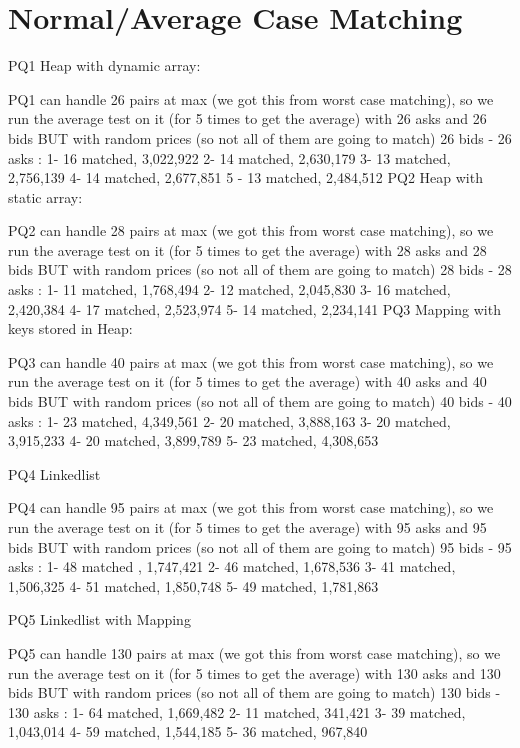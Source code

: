  \section{Normal/Average Case Matching}
 

 
PQ1 Heap with dynamic array:

 PQ1 can handle 26 pairs at max (we got this from worst case matching), so we run the average test on it (for 5 times to get the average) with 26 asks and 26 bids BUT with random prices (so not all of them are going to match)
26 bids - 26 asks : 
1- 16 matched, 3,022,922
2- 14 matched, 2,630,179
3- 13 matched, 2,756,139
4- 14 matched, 2,677,851
5 - 13 matched, 2,484,512
PQ2 Heap with static array:

 PQ2 can handle 28 pairs at max (we got this from worst case matching), so we run the average test on it (for 5 times to get the average) with 28 asks and 28 bids BUT with random prices (so not all of them are going to match)
28 bids - 28 asks : 
1- 11 matched, 1,768,494
2- 12 matched, 2,045,830
3- 16 matched, 2,420,384
4- 17 matched, 2,523,974
5- 14 matched, 2,234,141
PQ3 Mapping with keys stored in Heap:

 PQ3 can handle 40 pairs at max (we got this from worst case matching), so we run the average test on it (for 5 times to get the average) with 40 asks and 40 bids BUT with random prices (so not all of them are going to match)
40 bids - 40 asks : 
1- 23 matched, 4,349,561
2- 20 matched, 3,888,163
3- 20 matched, 3,915,233
4- 20 matched, 3,899,789
5- 23 matched, 4,308,653

PQ4 Linkedlist

PQ4 can handle 95 pairs at max (we got this from worst case matching), so we run the average test on it (for 5 times to get the average) with 95 asks and 95 bids BUT with random prices (so not all of them are going to match)
95 bids - 95 asks : 
1- 48 matched , 1,747,421
2- 46 matched, 1,678,536
3- 41 matched, 1,506,325
4- 51 matched, 1,850,748
5- 49 matched, 1,781,863

PQ5 Linkedlist with Mapping

PQ5 can handle 130 pairs at max (we got this from worst case matching), so we run the average test on it (for 5 times to get the average) with 130 asks and 130 bids BUT with random prices (so not all of them are going to match)
130 bids - 130 asks : 
1- 64 matched, 1,669,482
2- 11 matched, 341,421
3- 39 matched, 1,043,014
4- 59 matched, 1,544,185
5- 36 matched, 967,840





